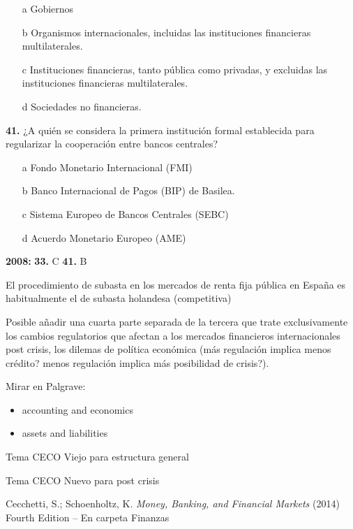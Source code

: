 \documentclass{nuevotema}
\begin{document}
\begin{itemize}
	\item[a] Gobiernos
	\item[b] Organismos internacionales, incluidas las instituciones financieras multilaterales.
	\item[c] Instituciones financieras, tanto pública como privadas, y excluidas las instituciones financieras multilaterales.
	\item[d] Sociedades no financieras.
\end{itemize}

\textbf{41.} ¿A quién se considera la primera institución formal establecida para regularizar la cooperación entre bancos centrales?

\begin{itemize}
	\item[a] Fondo Monetario Internacional (FMI)
	\item[b] Banco Internacional de Pagos (BIP) de Basilea.
	\item[c] Sistema Europeo de Bancos Centrales (SEBC)
	\item[d] Acuerdo Monetario Europeo (AME)
\end{itemize}

\notas

\textbf{2008:} \textbf{33.} C \textbf{41.} B

El procedimiento de subasta en los mercados de renta fija pública en España es habitualmente el de subasta holandesa (competitiva)

Posible añadir una cuarta parte separada de la tercera que trate exclusivamente los cambios regulatorios que afectan a los mercados financieros internacionales post crisis, los dilemas de política económica (más regulación implica menos crédito? menos regulación implica más posibilidad de crisis?).


\bibliografia

Mirar en Palgrave:
\begin{itemize}
	\item accounting and economics
	\item assets and liabilities
\end{itemize}

Tema CECO Viejo para estructura general

Tema CECO Nuevo para post crisis

Cecchetti, S.; Schoenholtz, K. \textit{Money, Banking, and Financial Markets} (2014) Fourth Edition -- En carpeta Finanzas
\end{document}
